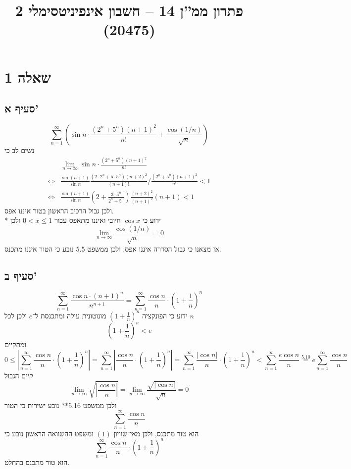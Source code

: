 
\title{פתרון ממ''ן 14 – חשבון אינפיניטסימלי 2 (20475)}


\maketitle
\maketitleprint{}

\section{שאלה 1}
\subsection{סעיף א'}
\[
	\sum_{n = 1}^\infty \left( \sin n \cdot \frac{ (2^n + 5^n) {(n + 1)}^2}{n!} + \frac{\cos(1/n)}{\sqrt{n}} \right)
\]
נשים לב כי
\begin{align*}
	& \lim_{n \to \infty} \sin n \cdot \frac{ (2^n + 5^n) {(n + 1)}^2}{n!} \\
	\iff & \frac{\sin(n + 1)}{\sin n} \frac{ (2 \cdot 2^n + 5 \cdot 5^n) {(n + 2)}^2}{(n + 1)!} / \frac{ (2^n + 5^n) {(n + 1)}^2}{n!} < 1 \\
	\iff & \frac{\sin(n + 1)}{\sin n} (2 + \frac{3 \cdot 5^n}{2^n + 5^n}) \frac{{(n + 2)}^2}{{(n + 1)}^2}(n + 1) < 1
\end{align*}
ולכן גבול הרכיב הראשון בטור איננו אפס. \\*
ידוע כי $\cos x$ חיובי ואיננו מתאפס עבור $0 < x \le 1$ ולכן
\[
	\lim_{n \to \infty} \frac{\cos(1/n)}{\sqrt{n}} = 0
\]
אז מצאנו כי גבול הסדרה איננו אפס, ולכן ממשפט 5.5 נובע כי הטור איננו מתכנס.

\subsection{סעיף ב'}
\[
	\sum_{n = 1}^{\infty} \frac{\cos n \cdot {(n + 1)}^n}{n^{n + 1}}
	= \sum_{n = 1}^{\infty} \frac{\cos n}{n} \cdot {(1 + \frac{1}{n})}^n
\]
ידוע כי הפונקציה ${(1 + \frac{1}{n})}^n$ מונוטונית עולה ומתכנסת ל־$e$ ולכן לכל $n$
\[
	{(1 + \frac{1}{n})}^n < e
\]
ומתקיים
\[
	0 \le
	\left\lvert \sum_{n = 1}^{\infty} \frac{\cos n}{n} \cdot {(1 + \frac{1}{n})}^n \right\rvert
	= \sum_{n = 1}^{\infty} \left\lvert \frac{\cos n}{n} \cdot {(1 + \frac{1}{n})}^n \right\rvert
	= \sum_{n = 1}^{\infty} \frac{\lvert \cos n \rvert}{n} \cdot {(1 + \frac{1}{n})}^n
	< \sum_{n = 1}^{\infty} \frac{e \cos n}{n}
	\overset{5.10}{=} e \sum_{n = 1}^{\infty} \frac{\cos n}{n}
	\tag{1}
\]
קיים הגבול
\[
	\lim_{n \to \infty} \sqrt{\left\lvert \frac{\cos n}{n} \right\rvert}
	= \lim_{n \to \infty} \frac{\sqrt{\left\lvert \cos n \right\rvert}}{\sqrt{n}} = 0
\]
ולכן ממשפט 5.16** נובע ישירות כי הטור
\[
	\sum_{n = 1}^{\infty} \frac{\cos n}{n}
\]
הוא טור מתכנס, ולכן מאי־שוויון $(1)$ ומשפט ההשוואה הראשון נובע כי
\[
	\sum_{n = 1}^{\infty} \frac{\cos n}{n} \cdot {(1 + \frac{1}{n})}^n
\]
הוא טור מתכנס בהחלט.

